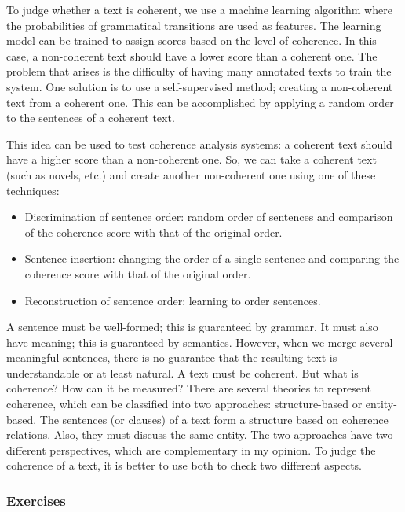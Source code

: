 \documentclass{KBook}
\begin{document}
To judge whether a text is coherent, we use a machine learning algorithm where the probabilities of grammatical transitions are used as features. The learning model can be trained to assign scores based on the level of coherence. In this case, a non-coherent text should have a lower score than a coherent one. The problem that arises is the difficulty of having many annotated texts to train the system. One solution is to use a self-supervised method; creating a non-coherent text from a coherent one. This can be accomplished by applying a random order to the sentences of a coherent text.

This idea can be used to test coherence analysis systems: a coherent text should have a higher score than a non-coherent one. So, we can take a coherent text (such as novels, etc.) and create another non-coherent one using one of these techniques:
\begin{itemize}
	\item Discrimination of sentence order: random order of sentences and comparison of the coherence score with that of the original order.
	\item Sentence insertion: changing the order of a single sentence and comparing the coherence score with that of the original order.
	\item Reconstruction of sentence order: learning to order sentences.
\end{itemize}


A sentence must be well-formed; this is guaranteed by grammar. 
It must also have meaning; this is guaranteed by semantics. 
However, when we merge several meaningful sentences, there is no guarantee that the resulting text is understandable or at least natural. 
A text must be coherent. 
But what is coherence? How can it be measured?
There are several theories to represent coherence, which can be classified into two approaches: structure-based or entity-based. 
The sentences (or clauses) of a text form a structure based on coherence relations. 
Also, they must discuss the same entity.
The two approaches have two different perspectives, which are complementary in my opinion. 
To judge the coherence of a text, it is better to use both to check two different aspects.



\subsubsection*{Exercises}
\end{document}
